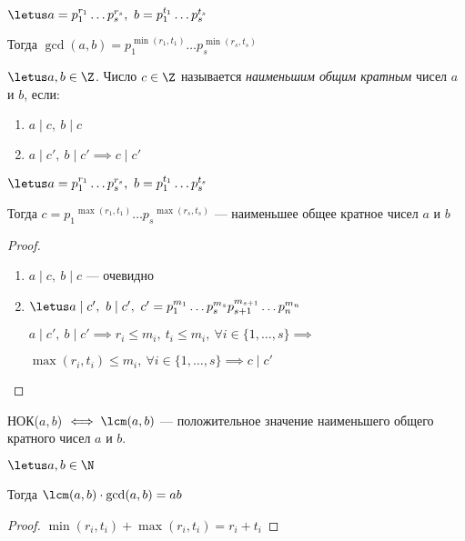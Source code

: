 \begin{follow}
    $\letus a = p_1^{r_1} \ldots p_s^{r_s},~b = p_1^{t_1} \ldots p_s^{t_s}$

    Тогда $\gcd(a, b) = p_1^{\min(r_1, t_1)} \ldots p_s^{\min(r_s, t_s)}$
\end{follow}

\begin{defn}
    $\letus a, b \in \Z$. Число $c \in \Z$ называется \emph{наименьшим общим кратным} чисел $a$ и $b$, если:
    \begin{enumerate}
        \item $a \mid c,~ b \mid c$
        \item $a \mid c',~ b \mid c' \implies c \mid c'$
    \end{enumerate}
\end{defn}

\begin{theorem-non}
    $\letus a = p_1^{r_1} \ldots p_s^{r_s},~ b = p_1^{t_1} \ldots p_s^{t_s}$

    Тогда $c = {p_1}^{\max(r_1, t_1)} \ldots {p_s}^{\max(r_s, t_s)}$ --- наименьшее общее кратное чисел $a$ и $b$
\end{theorem-non}

\begin{proof}
    
    \begin{enumerate}
        \item $a \mid c,~ b \mid c$ --- очевидно
        
        \item $\letus a \mid c',~ b \mid c',~ c' = p_1^{m_1} \ldots p_s^{m_s} p_{s+1}^{m_{s+1}} \ldots p_n^{m_n}$

        $a \mid c',~ b \mid c' \implies r_i \leq m_i,~ t_i \leq m_i,~\forall i \in \{1, \ldots, s\} \implies$
    
        $\max(r_i, t_i) \leq m_i,~ \forall i \in \{1, \ldots, s\} \implies c \mid c'$
    \end{enumerate}
\end{proof}

\begin{defn}
    НОК($a, b$) $\iff \lcm(a, b)$ --- положительное значение наименьшего общего кратного чисел $a$ и $b$. 
\end{defn}

\begin{follow}
    $\letus a, b \in \N$

    Тогда $\lcm(a, b) \cdot \gcd(a, b) = ab$
\end{follow}

\begin{proof}
    $\min(r_i, t_i) + \max(r_i, t_i) = r_i + t_i$
\end{proof}